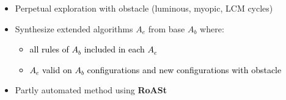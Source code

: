 \begin{frame}{}

\begin{itemize}\setlength\itemsep{0.5cm}
  \item<1-> Perpetual exploration with obstacle (luminous, myopic, LCM cycles)
  
  \item<2-> Synthesize extended algorithms $A_e$ from base $A_b$ where:
        \begin{itemize}\setlength\itemsep{0.2cm}
            \item<3->[\textcolor{accent}{\scriptsize$\hookrightarrow$}] \textcolor{black}{all rules of $A_b$ included in each $A_e$}
            \item<4->[\textcolor{accent}{\scriptsize$\hookrightarrow$}] \textcolor{black}{$A_e$ valid on $A_b$ configurations and new configurations with obstacle}
        \end{itemize}
  \item<5-> Partly automated method using \textbf{RoASt}
\end{itemize}

\end{frame}

